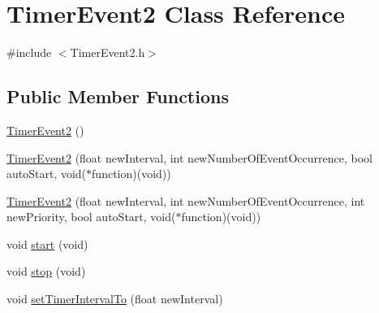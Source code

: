 \hypertarget{class_timer_event2}{
\section{TimerEvent2 Class Reference}
\label{de/df5/class_timer_event2}
}


{\ttfamily \#include $<$TimerEvent2.h$>$}

\subsection*{Public Member Functions}
\begin{DoxyCompactItemize}
\item 
\hyperlink{class_timer_event2_aafef15120ed44b85995988864408d920}{TimerEvent2} ()
\item 
\hyperlink{class_timer_event2_a4b1ac70be2f8a61c2ffe3b1684b7354a}{TimerEvent2} (float newInterval, int newNumberOfEventOccurrence, bool autoStart, void($\ast$function)(void))
\item 
\hyperlink{class_timer_event2_a517f9e45e5e537149a851fae4f64e5b3}{TimerEvent2} (float newInterval, int newNumberOfEventOccurrence, int newPriority, bool autoStart, void($\ast$function)(void))
\item 
void \hyperlink{class_timer_event2_a2e95c4ec60aa36081b140f00e248836c}{start} (void)
\item 
void \hyperlink{class_timer_event2_a4cdefad3e8b4bc89911137b60f4db9d6}{stop} (void)
\item 
void \hyperlink{class_timer_event2_a3ef5c5adca5fb7e6efce31351e2acb91}{setTimerIntervalTo} (float newInterval)
\end{DoxyCompactItemize}


